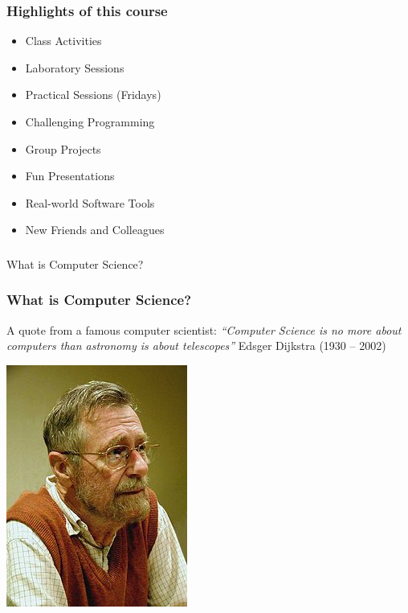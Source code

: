 \documentclass{beamer}
\begin{document}
\begin{frame}
  \frametitle{Highlights of this course}
    \begin{itemize}
        \item Class Activities \pause
        \item Laboratory Sessions \pause
        \item Practical Sessions (Fridays) \pause
        \item Challenging Programming \pause
		\item Group Projects \pause
		\item Fun Presentations \pause
		\item Real-world Software Tools \pause
		\item New Friends and Colleagues
    \end{itemize}

\end{frame}

\begin{frame}
  \frametitle{}
	\begin{block}{
		\Huge{What is Computer Science?}}
    \end{block}
\end{frame}
\begin{frame}
  \frametitle{What is Computer Science?}
  A quote from a famous computer scientist:
\emph{``Computer Science is no more about computers 
than astronomy is about telescopes''}
Edsger Dijkstra (1930 – 2002)
		 \begin{center}
    			\includegraphics[scale=0.25]{images/d}
    	\end{center}
\end{frame}
\end{document}
